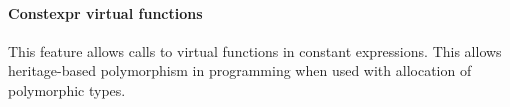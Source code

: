 \documentclass[../../main.tex]{subfiles}
\begin{document}
\paragraph{Constexpr virtual functions} This feature allows calls to virtual
functions in constant expressions\cite{virtual-constexpr}. This allows
heritage-based polymorphism in \constexpr programming when used with
\constexpr allocation of polymorphic types.

%
%


%

\end{document}
